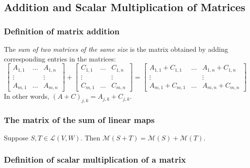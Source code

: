 \documentclass[11pt]{article}
\begin{document}
    \subsection{Addition and Scalar Multiplication of Matrices}

    \subsubsection{Definition of matrix addition}

    The \emph{sum of two matrices of the same size} is the matrix obtained by adding corresponding entries in the matrices:
    \begin{equation*}
        \begin{bmatrix}
            A_{1,1} & \dots & A_{1,n} \\
            \vdots  &       & \vdots  \\
            A_{m,1} & \dots & A_{m,n}
        \end{bmatrix} + \begin{bmatrix}
                            C_{1,1} & \dots & C_{1,n} \\
                            \vdots  &       &  \vdots \\
                            C_{m,1} & \dots & C_{m,n}
                        \end{bmatrix} = \begin{bmatrix}
                                            A_{1,1} + C_{1,1} & \dots & A_{1,n} + C_{1,n} \\
                                            \vdots            &       &   \vdots          \\
                                            A_{m,1} + C_{m,1} & \dots & A_{m,n} + C_{m,n}
                                        \end{bmatrix}
    \end{equation*}
    In other words, \((A+C)_{j,k} = A_{j,k} + C_{j,k}.\)

    \subsubsection{The matrix of the sum of linear maps}

    Suppose \(S,T \in \mathcal{L}(V,W)\). Then \(\mathcal{M}(S + T) = \mathcal{M}(S) + \mathcal{M}(T)\). 

    \subsubsection{Definition of scalar multiplication of a matrix}
\end{document}
